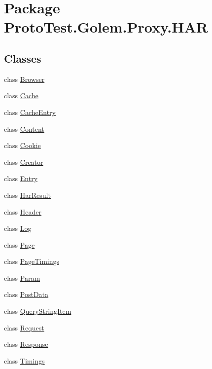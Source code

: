 \hypertarget{namespace_proto_test_1_1_golem_1_1_proxy_1_1_h_a_r}{\section{Package Proto\-Test.\-Golem.\-Proxy.\-H\-A\-R}
\label{namespace_proto_test_1_1_golem_1_1_proxy_1_1_h_a_r}
}
\subsection*{Classes}
\begin{DoxyCompactItemize}
\item 
class \hyperlink{class_proto_test_1_1_golem_1_1_proxy_1_1_h_a_r_1_1_browser}{Browser}
\item 
class \hyperlink{class_proto_test_1_1_golem_1_1_proxy_1_1_h_a_r_1_1_cache}{Cache}
\item 
class \hyperlink{class_proto_test_1_1_golem_1_1_proxy_1_1_h_a_r_1_1_cache_entry}{Cache\-Entry}
\item 
class \hyperlink{class_proto_test_1_1_golem_1_1_proxy_1_1_h_a_r_1_1_content}{Content}
\item 
class \hyperlink{class_proto_test_1_1_golem_1_1_proxy_1_1_h_a_r_1_1_cookie}{Cookie}
\item 
class \hyperlink{class_proto_test_1_1_golem_1_1_proxy_1_1_h_a_r_1_1_creator}{Creator}
\item 
class \hyperlink{class_proto_test_1_1_golem_1_1_proxy_1_1_h_a_r_1_1_entry}{Entry}
\item 
class \hyperlink{class_proto_test_1_1_golem_1_1_proxy_1_1_h_a_r_1_1_har_result}{Har\-Result}
\item 
class \hyperlink{class_proto_test_1_1_golem_1_1_proxy_1_1_h_a_r_1_1_header}{Header}
\item 
class \hyperlink{class_proto_test_1_1_golem_1_1_proxy_1_1_h_a_r_1_1_log}{Log}
\item 
class \hyperlink{class_proto_test_1_1_golem_1_1_proxy_1_1_h_a_r_1_1_page}{Page}
\item 
class \hyperlink{class_proto_test_1_1_golem_1_1_proxy_1_1_h_a_r_1_1_page_timings}{Page\-Timings}
\item 
class \hyperlink{class_proto_test_1_1_golem_1_1_proxy_1_1_h_a_r_1_1_param}{Param}
\item 
class \hyperlink{class_proto_test_1_1_golem_1_1_proxy_1_1_h_a_r_1_1_post_data}{Post\-Data}
\item 
class \hyperlink{class_proto_test_1_1_golem_1_1_proxy_1_1_h_a_r_1_1_query_string_item}{Query\-String\-Item}
\item 
class \hyperlink{class_proto_test_1_1_golem_1_1_proxy_1_1_h_a_r_1_1_request}{Request}
\item 
class \hyperlink{class_proto_test_1_1_golem_1_1_proxy_1_1_h_a_r_1_1_response}{Response}
\item 
class \hyperlink{class_proto_test_1_1_golem_1_1_proxy_1_1_h_a_r_1_1_timings}{Timings}
\end{DoxyCompactItemize}
